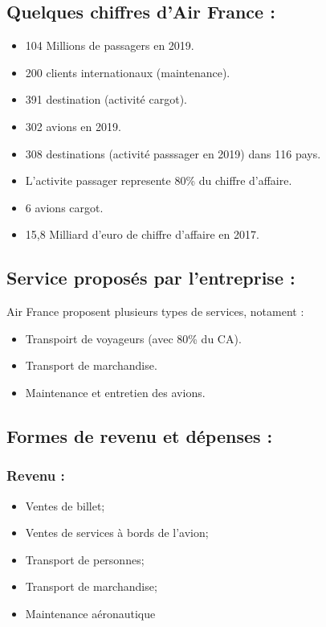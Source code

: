 \documentclass[oneside,13pt,a4paper]{article}
\begin{document}
\subsection{Quelques chiffres d'Air France : }
\begin{itemize}
  \item 104 Millions de passagers en 2019.
  \item 200 clients internationaux (maintenance).
  \item 391 destination (activité cargot). 
  \item 302 avions en 2019.
  \item 308 destinations (activité passsager en 2019) dans 116 pays.
  \item L'activite passager represente 80\% du chiffre d'affaire.
  \item 6 avions cargot.
  \item 15,8 Milliard d'euro de chiffre d'affaire en 2017.
\end{itemize}

\subsection{Service proposés par l'entreprise : }
Air France proposent plusieurs types de services, notament :
\begin{itemize}
  \item Transpoirt de voyageurs (avec 80\% du CA).
  \item Transport de marchandise.
  \item Maintenance et entretien des avions.
\end{itemize}

\subsection{Formes de revenu et dépenses :}

\subsubsection{Revenu :}

\begin{itemize}
  \item Ventes de billet;
  \item Ventes de services à bords de l'avion;
  \item Transport de personnes;
  \item Transport de marchandise;
  \item Maintenance aéronautique
\end{itemize}
\end{document}
